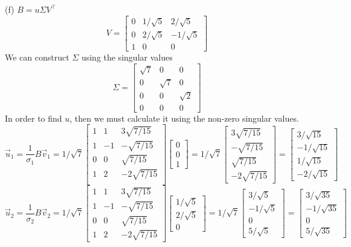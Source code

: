 \documentclass{report}
\begin{document}
(f) $B = u\Sigma V^\top$
$$
V = \begin{bmatrix}
0&1/\sqrt{5}&2/\sqrt{5}\\
0&2/\sqrt{5}&-1/\sqrt{5}\\
1&0&0
\end{bmatrix}
$$
We can construct $\Sigma$ using the singular values
$$
\Sigma = \begin{bmatrix}
\sqrt{7}&0&0\\
0&\sqrt{7}&0\\
0&0&\sqrt{2}\\
0&0&0
\end{bmatrix}
$$
In order to find $u$, then we must calculate it using the non-zero singular values.
$$
\vec{u}_1 = \frac{1}{\sigma_1}B\vec{v}_1 = 1/\sqrt{7}\begin{bmatrix}
1&1&3\sqrt{7/15}\\
1&-1&-\sqrt{7/15}\\
0&0&\sqrt{7/15}\\
1&2&-2\sqrt{7/15}\\
\end{bmatrix}
\begin{bmatrix}0\\0\\1\end{bmatrix} = 1/\sqrt{7}\begin{bmatrix}3\sqrt{7/15}\\-\sqrt{7/15}\\\sqrt{7/15}\\-2\sqrt{7/15}\end{bmatrix} = \begin{bmatrix}3/\sqrt{15}\\-1/\sqrt{15}\\1/\sqrt{15}\\-2/\sqrt{15}\end{bmatrix}
$$
$$
\vec{u}_2  = \frac{1}{\sigma_2}B\vec{v}_2 = 1/\sqrt{7}
\begin{bmatrix}
1&1&3\sqrt{7/15}\\
1&-1&-\sqrt{7/15}\\
0&0&\sqrt{7/15}\\
1&2&-2\sqrt{7/15}
\end{bmatrix}
\begin{bmatrix}1/\sqrt{5}\\2/\sqrt{5}\\0\end{bmatrix} = 1/\sqrt{7}\begin{bmatrix}3/\sqrt{5}\\-1/\sqrt{5}\\0\\5/\sqrt{5}\end{bmatrix} = \begin{bmatrix} 3/\sqrt{35}\\-1/\sqrt{35}\\0\\5/\sqrt{35}\end{bmatrix}
$$
\end{document}
